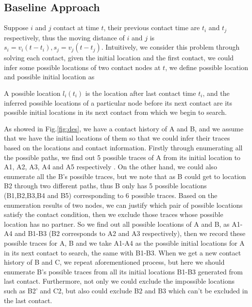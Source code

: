 \subsection{Baseline Approach}
Suppose $i$ and $j$ contact at time $t$, their previous contact time are $t_i$ and $t_j$ respectively, thus the moving distance of $i$ and $j$ is $s_i=v_i(t-t_i),s_j=v_j(t-t_j)$. Intuitively, we consider this problem through solving each contact, given the initial location and the first contact, we could infer some possible locations of two contact nodes at $t$, we define possible location and possible initial location as
\begin{definition}
A possible location $l_i(t_i)$ is the location after last contact time $t_i$, and the inferred possible locations of a particular node before its next contact are its possible initial locations in its next contact from which we begin to search.
\end{definition}
As showed in Fig.\ref{fig:des}, we have a contact history of A and B, and we assume that we have the initial locations of them so that we could infer their traces based on the locations and contact information. Firstly through enumerating all the possible paths, we find out 5 possible traces of A from its initial location to A1, A2, A3, A4 and A5 respectively . On the other hand, we could also enumerate all the B's possible traces, but we note that as B could get to location B2 through two different paths, thus B only has 5 possible locations (B1,B2,B3,B4 and B5) corresponding to 6 possible traces. Based on the enumeration results of two nodes, we can justify which pair of possible locations satisfy the contact condition, then we exclude those traces whose possible location has no partner. So we find out all possible locations of A and B, as A1-A4 and B1-B3 (B2 corresponds to A2 and A3 respectively), then we record these possible traces for A, B and we take A1-A4 as the possible initial locations for A in its next contact to search, the same with B1-B3. When we get a new contact history of B and C, we repeat aforementioned process, but here we should enumerate B's possible traces from all its initial locations B1-B3 generated from last contact. Furthermore, not only we could exclude the impossible locations such as B2' and C2, but also could exclude B2 and B3 which can't be excluded in the last contact.







